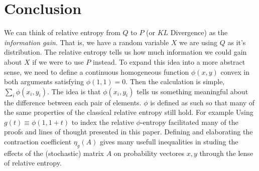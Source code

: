 \section{Conclusion}
We can think of relative entropy from $Q$ to $P$ (or $KL$ Divergence) as the \textit{information gain}. That is, we have a random variable $X$ we are using $Q$ as it's distribution. The relative entropy tells us how much information we could gain about $X$ if we were to use $P$ instead. To expand this idea into a more abstract sense, we need to define a continuous homogeneous function $\phi(x,y)$ convex in both arguments satisfying $\phi(1,1)=0$.  Then the calculation is simple, $\sum_i \phi(x_i, y_i)$. The idea is that $\phi(x_i, y_i)$ tells us something meaningful about the difference between each pair of elements. $\phi$ is defined as such so that many of the same properties of the classical relative entropy still hold. For example Using $g(t) \equiv \phi(1, 1+t)$ to index the relative $\phi$-entropy facilitated many of the proofs and lines of thought presented in this paper. Defining and elaborating the contraction coefficient $\eta_g(A)$ gives many usefull inequalities in studing the effects of the (stochastic) matrix $A$ on probability vectores $x,y$ through the lense of relative entropy.

